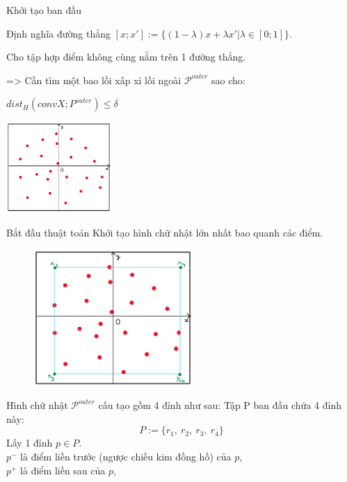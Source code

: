 \documentclass[11pt]{beamer}
\theoremstyle{definition}
\theoremstyle{plain}
\theoremstyle{plain}
\theoremstyle{remark}
\begin{document}
	
	\begin{frame}{Khởi tạo ban đầu}
			\begin{center}
			Định nghĩa đường thẳng $[x; x'] := \{(1 - \lambda)x + \lambda x' | \lambda \in [0; 1]\}$.\\
		\end{center}
		Cho tập hợp điểm không cùng nằm trên 1 đường thẳng.
		
	
		=> Cần tìm một bao lồi xấp xỉ lồi ngoài $\mathcal{P}^{outer}$ sao cho: 
		\begin{center}
			$dist_H(conv X; P^{outer}) \leq \delta$
		\end{center}
			\begin{center}
				\includegraphics[width=4cm]{Figures/khoi_tao_tap_diem}
			\end{center}
	\end{frame}
	\begin{frame}{Bắt đầu thuật toán}
		Khởi tạo hình chữ nhật lớn nhất bao quanh các điểm.
		\begin{figure}
			\label{fig:khoitaohcnbaoquanh}
			\includegraphics[width=6cm]{Figures/khoi_tao_hcn_bao_quanh}
		\end{figure}
	\end{frame}
	\begin{frame}
		Hình chữ nhật $\mathcal{P}^{outer}$ cấu tạo gồm 4 đỉnh như sau:
		Tập P ban đầu chứa 4 đỉnh này:\\
		\begin{equation}\label{def_4r-2}
			P := \{r_1,\ r_2,\ r_3,\ r_4\}
		\end{equation}
			Lấy 1 đỉnh $p \in P$.\\
		$p^{-}$ là điểm liền trước (ngược chiều kim đồng hồ) của $p$,\\
		$p^{+}$ là điểm liền sau của $p$,\\
	\end{frame}
\end{document}
